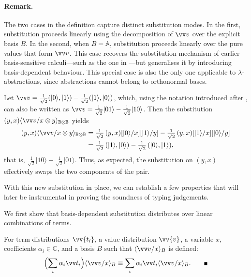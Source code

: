 \documentclass[runningheads,orivec,envcountsame,envcountsect]{llncs}
\providecommand{\qed}{\hbox{\rule{1ex}{1ex}}}%
\newcommand\ket[1]{\ensuremath{|#1\rangle}}
\newcommand\ansubst[2]{\ensuremath{\langle #1 \rangle_{#2}}}
\newcommand\AbsBasis{\ensuremath{\mathbb{A}}}
\def\C{\mathbb{C}}            %
\def\Pair#1#2{(#1,#2)} %
\newcommand\B{\mathbb B}
\begin{document}
\paragraph{Remark.}
The two cases in the definition capture distinct substitution modes.  
In the first, substitution proceeds linearly using the decomposition of
$\vv v$ over the explicit basis $B$.  
In the second, when $B=\AbsBasis$, substitution proceeds linearly over the pure
values that form $\vv v$.  
This case recovers the substitution mechanism of earlier
basis-sensitive calculi---such as the one in
\cite{DiazcaroGuillermoMiquelValironLICS19}---but generalises it by introducing
basis-dependent behaviour.  
This special case is also the only one applicable to
$\lambda$-abstractions, since abstractions cannot belong to orthonormal bases.


\begin{example}
  Let
  \(
    \vv v
    = \tfrac{1}{\sqrt{2}}\Pair{\ket{0}}{\ket{1}}
      - \tfrac{1}{\sqrt{2}}\Pair{\ket{1}}{\ket{0}}
    \),
  which, using the notation introduced after , can also be written as
  $\vv v = \tfrac{1}{\sqrt{2}}\ket{01}
           - \tfrac{1}{\sqrt{2}}\ket{10}$.
  Then the substitution
  $(y,x)\ansubst{\vv v/x\otimes y}{\B\otimes\B}$ yields
  \begin{align*}
    (y,x)\ansubst{\vv v/x\otimes y}{\B\otimes\B}
    &= \tfrac{1}{\sqrt{2}}\,(y,x)[\ket{0}/x][\ket{1}/y]
       - \tfrac{1}{\sqrt{2}}\,(y,x)[\ket{1}/x][\ket{0}/y] \\
    &= \tfrac{1}{\sqrt{2}}\,(\ket{1},\ket{0})
       - \tfrac{1}{\sqrt{2}}\,(\ket{0},\ket{1}),
  \end{align*}
  that is,
  $\tfrac{1}{\sqrt{2}}\ket{10}
   - \tfrac{1}{\sqrt{2}}\ket{01}$.
  Thus, as expected, the substitution on $(y,x)$ effectively swaps the two
  components of the pair.
\end{example}

With this new substitution in place, we can establish a few properties that
will later be instrumental in proving the soundness of typing judgements.

We first show that basis-dependent substitution distributes over linear
combinations of terms.

\begin{lemma}\label{lem:distributiveSubstitution}
  For term distributions $\vv{t_i}$, a value distribution $\vv{v}$, a
  variable $x$, coefficients $\alpha_i\in\C$, and a basis $B$ such that
  $\ansubst{\vv v/x}{B}$ is defined:
  \[
    \Bigl(\sum_i \alpha_i\vv t_i\Bigr)\ansubst{\vv v/x}{B}
    \equiv
    \sum_i \alpha_i\vv t_i \ansubst{\vv v/x}{B}.
    \tag*{\qed}
  \]
\end{lemma}
\end{document}
